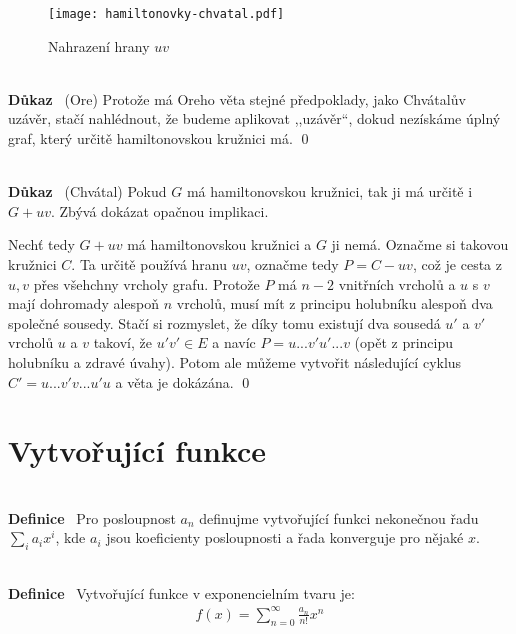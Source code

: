 \documentclass{article}
\renewcommand{\paragraph}[1]{\ \\\smallskip\noindent\textbf{#1}\ }
\begin{document}
\begin{wrapfigure}{r}{0.3\textwidth}
\centering
\texttt{[image: hamiltonovky-chvatal.pdf]}
\caption{Nahrazení hrany $uv$}
\label{hamiltonovky:chvatal}
\end{wrapfigure}

\paragraph{Důkaz} (Ore) Protože má Oreho věta stejné předpoklady, jako Chvátalův 
uzávěr, stačí nahlédnout, že budeme aplikovat ,,uzávěr``, dokud nezískáme úplný 
graf, který určitě hamiltonovskou kružnici má. \qed

\paragraph{Důkaz} (Chvátal) Pokud $G$ má hamiltonovskou kružnici, tak ji má 
určitě i $G+uv$. Zbývá dokázat opačnou implikaci.  

Nechť tedy $G+uv$ má hamiltonovskou kružnici a $G$ ji nemá. Označme si takovou 
kružnici $C$. Ta určitě používá hranu $uv$, označme tedy $P=C-uv$, což je cesta 
z $u,v$ přes všehchny vrcholy grafu. Protože $P$ má $n-2$ vnitřních vrcholů a 
$u$ s $v$ mají dohromady alespoň $n$ vrcholů, musí mít z principu holubníku 
alespoň dva společné sousedy. Stačí si rozmyslet, že díky tomu existují dva 
sousedá $u'$ a $v'$ vrcholů $u$ a $v$ takoví, že $u'v'\in E$ a navíc 
$P=u...v'u'...v$ (opět z principu holubníku a zdravé úvahy). Potom ale můžeme 
vytvořit následující cyklus $C'=u...v'v...u'u$ a věta je dokázána. \qed

\section{Vytvořující funkce}
\paragraph{Definice} Pro posloupnost $a_n$ definujme vytvořující funkci 
nekonečnou řadu $\sum_i a_ix^i$, kde $a_i$ jsou koeficienty posloupnosti a řada 
konverguje pro nějaké $x$.

\paragraph{Definice} Vytvořující funkce v exponencielním tvaru je:
\begin{align}
	f(x) = \sum_{n=0}^\infty \frac{a_n}{n!}x^n
\end{align}
\end{document}
